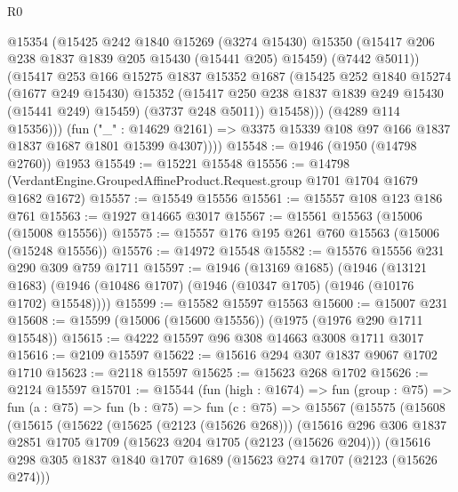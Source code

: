 \begin{lexlean}{R0}
\begin{coremodule}
                  @15354
                  (@15425
                    @242
                    @1840
                    @15269
                    (@3274 @15430)
                    @15350
                    (@15417 @206 @238 @1837 @1839 @205 @15430 (@15441 @205) @15459)
                    (@7442 @5011))
                  (@15417
                    @253
                    @166
                    @15275
                    @1837
                    @15352
                    @1687
                    (@15425
                      @252
                      @1840
                      @15274
                      (@1677 @249 @15430)
                      @15352
                      (@15417 @250 @238 @1837 @1839 @249 @15430 (@15441 @249) @15459)
                      (@3737 @248 @5011))
                    @15458)))
              (@4289 @114 @15356)))
          (fun ("_" : @14629 @2161) =>
          @3375 @15339 @108 @97 @166 @1837 @1837 @1687 @1801 @15399 @4307))))
@15548 := @1946 (@1950 (@14798 @2760)) @1953
@15549 := @15221 @15548
@15556 := @14798 (VerdantEngine.GroupedAffineProduct.Request.group @1701 @1704 @1679 @1682 @1672)
@15557 := @15549 @15556
@15561 := @15557 @108 @123 @186 @761
@15563 := @1927 @14665 @3017
@15567 := @15561 @15563 (@15006 (@15008 @15556))
@15575 := @15557 @176 @195 @261 @760 @15563 (@15006 (@15248 @15556))
@15576 := @14972 @15548
@15582 := @15576 @15556 @231 @290 @309 @759 @1711
@15597 := @1946
    (@13169 @1685)
    (@1946
      (@13121 @1683)
      (@1946 (@10486 @1707) (@1946 (@10347 @1705) (@1946 (@10176 @1702) @15548))))
@15599 := @15582 @15597 @15563
@15600 := @15007 @231
@15608 := @15599 (@15006 (@15600 @15556)) (@1975 (@1976 @290 @1711 @15548))
@15615 := @4222 @15597 @96 @308 @14663 @3008 @1711 @3017
@15616 := @2109 @15597
@15622 := @15616 @294 @307 @1837 @9067 @1702 @1710
@15623 := @2118 @15597
@15625 := @15623 @268 @1702
@15626 := @2124 @15597
@15701 := @15544
    (fun (high : @1674) =>
    fun (group : @75) =>
    fun (a : @75) =>
    fun (b : @75) =>
    fun (c : @75) =>
    @15567
      (@15575
        (@15608
          (@15615
            (@15622
              (@15625 (@2123 (@15626 @268)))
              (@15616
                @296
                @306
                @1837
                @2851
                @1705
                @1709
                (@15623 @204 @1705 (@2123 (@15626 @204)))
                (@15616
                  @298
                  @305
                  @1837
                  @1840
                  @1707
                  @1689
                  (@15623 @274 @1707 (@2123 (@15626 @274)))

\end{coremodule}
\end{lexlean}
